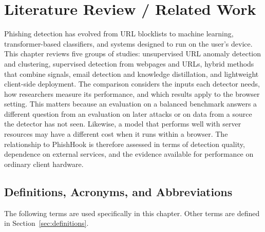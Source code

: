 \documentclass{FastFyp}
\begin{document}
\chapter{Literature Review / Related Work}
\label{ch:litreview}
Phishing detection has evolved from URL blocklists to machine learning, transformer-based classifiers, and systems designed to run on the user's device. This chapter reviews five groups of studies: unsupervised URL anomaly detection and clustering, supervised detection from webpages and URLs, hybrid methods that combine signals, email detection and knowledge distillation, and lightweight client-side deployment. The comparison considers the inputs each detector needs, how researchers measure its performance, and which results apply to the browser setting. This matters because an evaluation on a balanced benchmark answers a different question from an evaluation on later attacks or on data from a source the detector has not seen. Likewise, a model that performs well with server resources may have a different cost when it runs within a browser. The relationship to PhishHook is therefore assessed in terms of detection quality, dependence on external services, and the evidence available for performance on ordinary client hardware.

\section{Definitions, Acronyms, and Abbreviations}
\label{sec:litreview-definitions}
The following terms are used specifically in this chapter. Other terms are defined in Section~\ref{sec:definitions}.

\end{document}
